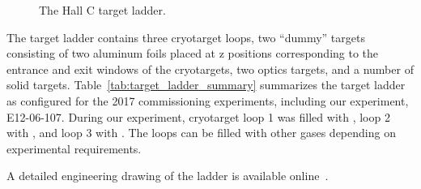 \begin{figure}[h]
\begin{subfigure}[t]{0.3\textwidth}
        \label{fig:target_ladder3}
    \end{subfigure}
    \caption{The Hall C target ladder.
             }
    \label{fig:target_ladder}
\end{figure}

The target ladder contains three cryotarget loops, two ``dummy'' targets
consisting of two aluminum foils placed at z positions corresponding to the
entrance and exit windows of the cryotargets, two optics targets, and a number
of solid targets.
Table~\ref{tab:target_ladder_summary} summarizes the target ladder as
configured for the 2017 commissioning experiments, including our experiment,
E12-06-107.
During our experiment, cryotarget loop 1 was filled with , loop 2
with , and loop 3 with .
The loops can be filled with other gases depending on experimental
requirements.

A detailed engineering drawing of the ladder is available online~\cite{target_drawing}.

